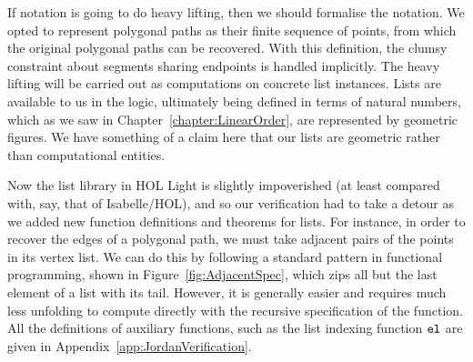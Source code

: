 


If notation is going to do heavy lifting, then we should formalise the notation. We opted to represent polygonal paths as their finite sequence of points, from which the original polygonal paths can be recovered. With this definition, the clumsy constraint about segments sharing endpoints is handled implicitly. The heavy lifting will be carried out as computations on concrete list instances. Lists are available to us in the logic, ultimately being defined in terms of natural numbers, which as we saw in Chapter~\ref{chapter:LinearOrder}, are represented by geometric figures. We have something of a claim here that our lists are geometric rather than computational entities.


Now the list library in HOL Light is slightly impoverished (at least compared with, say, that of Isabelle/HOL), and so our verification had to take a detour as we added new function definitions and theorems for lists. For instance, in order to recover the edges of a polygonal path, we must take adjacent pairs of the points in its vertex list. We can do this by following a standard pattern in functional programming, shown in Figure~\ref{fig:AdjacentSpec}, which zips all but the last element of a list with its tail. However, it is generally easier and requires much less unfolding to compute directly with the recursive specification of the function. All the definitions of auxiliary functions, such as the list indexing function $\texttt{el}$ are given in Appendix~\ref{app:JordanVerification}.

